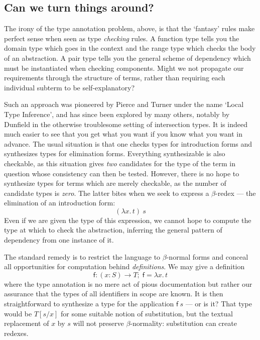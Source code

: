 \documentclass{jfp1}
\begin{document}
\subsection{Can we turn things around?}

The irony of the type annotation problem, above, is that the `fantasy' rules
make perfect sense when seen as type \emph{checking} rules. A function type
tells you the domain type which goes in the context and the range type which
checks the body of an abstraction. A pair type tells you the general scheme
of dependency which must be instantiated when checking components. Might we
not propagate our requirements through the structure of terms, rather than
requiring each individual subterm to be self-explanatory?

Such an approach was pioneered by Pierce and Turner under the name
`Local Type Inference', and has since been explored by many others,
notably by Dunfield in the otherwise troublesome setting of
intersection types. It is indeed much easier to see that you get what
you want if you know what you want in advance. The usual situation is
that one checks types for introduction forms and synthesizes types for
elimination forms. Everything synthesizable is also checkable, as this
situation gives \emph{two} candidates for the type of the term in
question whose consistency can then be tested. However, there is no
hope to synthesize types for terms which are merely checkable, as the
number of candidate types is \emph{zero}. The latter bites when we seek to
express a $\beta$-redex --- the elimination of an introduction form:
\[
  (\lambda x.\,t)\:s
\]
Even if we are given the type of this expression, we cannot hope
to compute the type at which to check the abstraction, inferring the
general pattern of dependency from one instance of it.

The standard remedy is to restrict the language to $\beta$-normal forms
and conceal all opportunities for computation behind \emph{definitions}. We may give a definition
\[\mathsf{f} : (x\!:\!S)\to T;\; \mathsf{f} = \lambda x.\,t
  \]
where the type annotation is no mere act of pious documentation but rather our
assurance that the types of all identifiers in scope are known.
It is then straightforward to synthesize a type for the application $\mathsf{f}\:s$ --- or
is it? That type would be $T[s/x]$ for some suitable notion of substitution, but the textual
replacement of $x$ by $s$ will not preserve $\beta$-normality: substitution can create redexes.
\end{document}
